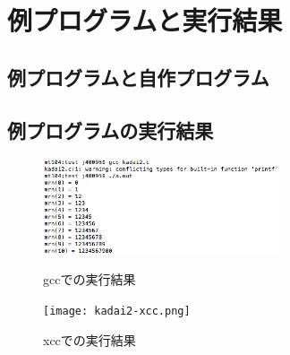 \documentclass[10pt]{jsarticle}
\begin{document}
\section{例プログラムと実行結果}

\subsection{例プログラムと自作プログラム}




\subsection{例プログラムの実行結果}
\begin{figure}[htbp]
 \begin{minipage}{0.5\hsize}
  \begin{center}
   \includegraphics[width=70mm]{kadai2-gcc.png}
  \end{center}
  \caption{gccでの実行結果}
 \end{minipage}
 \begin{minipage}{0.5\hsize}
  \begin{center}
   \texttt{[image: kadai2-xcc.png]}
  \end{center}
  \caption{xccでの実行結果}
 \end{minipage}
\end{figure}

\newpage
\end{document}
